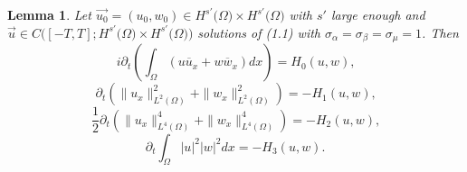 \documentclass[reqno]{amsart}
\newtheorem{lemma}{Lemma}[section]
\numberwithin{equation}{section}
\begin{document}
\begin{lemma}
Let $\overrightarrow{u_0}=(u_{0},w_{0})\in H^{s'}(\Omega
\mathbb{)}\times H^{s'}(\Omega\mathbb{)}$ with $s'$
large enough and $\overrightarrow{u}\in
C([-T,T];H^{s'}(\Omega\mathbb{)\times
}H^{s'}(\Omega\mathbb{))}$ solutions of (1.1) with
$\sigma_{\alpha}=\sigma_{\beta}=\sigma_{\mu}=1$. Then
\begin{equation}\label{5.1}
i\partial_{t}\left(  \int_{\Omega}(u\overline{u}_{x}+w\overline{w}_{x})dx\right)  =H_{0}(u,w)\text{,}
\end{equation}
\begin{equation}\label{5.2}
\partial_{t}\left(  \| u_{x}\| _{L^{2}\left(  \Omega\right)
}^{2}+\| w_{x}\| _{L^{2}\left(  \Omega\right)
}^{2}\right)
=-H_{1}(u,w)\text{,}
\end{equation}\begin{equation}\label{5.3}
\frac{1}{2}\partial_{t}\left(  \| u_{x}\|
_{L^{4}\left( \Omega\right)  }^{4}+\| w_{x}\|
_{L^{4}\left(  \Omega\right)
}^{4}\right)  =-H_{2}(u,w)\text{,}
\end{equation}\begin{equation}\label{5.4}
\partial_{t}\int_{\Omega}| u| ^{2}| w|
^{2}dx=-H_{3}(u,w)\text{.}
\end{equation}

\end{lemma}
\end{document}
